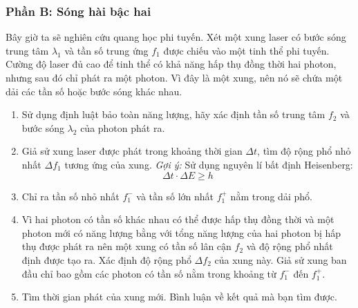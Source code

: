 \subsubsection*{Phần B: Sóng hài bậc hai}
\noindent Bây giờ ta sẽ nghiên cứu quang học phi tuyến. Xét một xung laser có bước sóng trung tâm $\lambda_1$ và tần số trung ứng $f_1$ được chiếu vào một tinh thể phi tuyến. Cường độ laser đủ cao để tinh thể có khả năng hấp thụ đồng thời hai photon, nhưng sau đó chỉ phát ra một photon. Vì đây là một xung, nên nó sẽ chứa một dải các tần số hoặc bước sóng khác nhau.
\begin{enumerate}
  \item Sử dụng định luật bảo toàn năng lượng, hãy xác định tần số trung tâm $f_2$ và bước sóng $\lambda_2$ của photon phát ra.
  \item Giả sử xung laser được phát trong khoảng thời gian $\Delta t$, tìm độ rộng phổ nhỏ nhất $\Delta f_1$ tương ứng của xung. \textit{Gợi ý:} Sử dụng nguyên lí bất định Heisenberg:
        \begin{equation*}
          \Delta t \cdot \Delta E \geq h
        \end{equation*}
  \item Chỉ ra tần số nhỏ nhất $f_1^-$ và tần số lớn nhất $f_1^+$ nằm trong dải phổ.
  \item Vì hai photon có tần số khác nhau có thể được hấp thụ đồng thời và một photon mới có năng lượng bằng với tổng năng lượng của hai photon bị hấp thụ được phát ra nên một xung có tần số lân cận $f_2$ và độ rộng phổ nhất định được tạo ra. Xác định độ rộng phổ $\Delta f_2$ của xung này. Giả sử xung ban đầu chỉ bao gồm các photon có tần số nằm trong khoảng từ $f_1^-$ đến $f_1^+$.
  \item Tìm thời gian phát của xung mới. Bình luận về kết quả mà bạn tìm được.
\end{enumerate}

